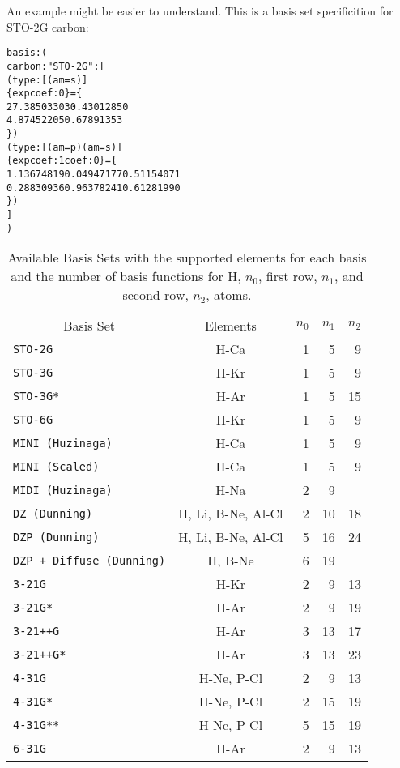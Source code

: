 An example might be easier to understand.  This is a basis set specificition
for STO-2G carbon:
\begin{alltt}
basis: (
 carbon: "STO-2G": [
  (type: [(am = s)]
   \{      exp      coef:0\} = \{
      27.38503303 0.43012850
       4.87452205 0.67891353
   \})
  (type: [(am = p) (am = s)]
   \{     exp      coef:1     coef:0\} = \{
       1.13674819 0.04947177 0.51154071
       0.28830936 0.96378241 0.61281990
   \})
 ]
)
\end{alltt}

\begin{htmlonly}
\begin{table}
\caption{Available Basis Sets with the supported elements for each basis
and the number of basis functions for H, $n_0$, first row, $n_1$, and
second row, $n_2$, atoms.}
\begin{tabular}{lcrrr}
  \multicolumn{1}{c}{Basis Set}&
   \multicolumn{1}{c}{Elements}&
   \multicolumn{1}{c}{$n_0$}&
   \multicolumn{1}{c}{$n_1$}&
   \multicolumn{1}{c}{$n_2$} \\
\verb*|STO-2G| & H-Ca & 1 & 5 & 9 \\
\verb*|STO-3G| & H-Kr & 1 & 5 & 9 \\
\verb*|STO-3G*| & H-Ar & 1 & 5 & 15 \\
\verb*|STO-6G| & H-Kr & 1 & 5 & 9 \\
\verb*|MINI (Huzinaga)| & H-Ca & 1 & 5 & 9 \\
\verb*|MINI (Scaled)| & H-Ca & 1 & 5 & 9 \\
\verb*|MIDI (Huzinaga)| & H-Na & 2 & 9 &  \\
\verb*|DZ (Dunning)| & H, Li, B-Ne, Al-Cl & 2 & 10 & 18 \\
\verb*|DZP (Dunning)| & H, Li, B-Ne, Al-Cl & 5 & 16 & 24 \\
\verb*|DZP + Diffuse (Dunning)| & H, B-Ne & 6 & 19 &  \\
\verb*|3-21G| & H-Kr & 2 & 9 & 13 \\
\verb*|3-21G*| & H-Ar & 2 & 9 & 19 \\
\verb*|3-21++G| & H-Ar & 3 & 13 & 17 \\
\verb*|3-21++G*| & H-Ar & 3 & 13 & 23 \\
\verb*|4-31G| & H-Ne, P-Cl & 2 & 9 & 13 \\
\verb*|4-31G*| & H-Ne, P-Cl & 2 & 15 & 19 \\
\verb*|4-31G**| & H-Ne, P-Cl & 5 & 15 & 19 \\
\verb*|6-31G| & H-Ar & 2 & 9 & 13 \\

\end{tabular}
\end{table}
\end{htmlonly}
